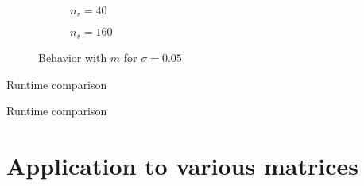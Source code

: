 \begin{figure}[ht]
    \centering
    \begin{subfigure}[b]{0.45\columnwidth}
        
        \caption{$n_v=40$}
        \label{fig:5-experiments-haydock-convergence-m-nv40}
    \end{subfigure}
    \begin{subfigure}[b]{0.5\columnwidth}
        
        \caption{$n_v=160$}
        \label{fig:5-experiments-haydock-convergence-m-nv160}
    \end{subfigure}
    \caption{Behavior with $m$ for $\sigma=0.05$}
    \label{fig:5-experiments-haydock-convergence-m}
\end{figure}


\begin{table}[ht]
    \caption{Runtime comparison}
    \label{tab:5-experiments-timing-DGC}
    
\end{table}

\begin{table}[ht]
    \caption{Runtime comparison}
    \label{tab:5-experiments-timing-haydock}
   
\end{table}


\section{Application to various matrices}
\label{sec:5-experiments-various-matrices}


